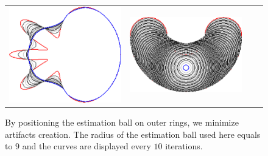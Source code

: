 {\begin{figure}
\begin{tabular}{p{3em}ccc}
\includegraphics[scale=0.25]{figures/chapter6/level-effect/flower/improve/len_pen0/radius-9/level9/summary.pdf} &
\includegraphics[scale=0.25]{figures/chapter6/level-effect/bean/improve/len_pen0/radius-9/level9/summary.pdf} \\[2em]
\end{tabular}
\caption{By positioning the estimation ball on outer rings, we minimize artifacts creation. The radius of the estimation ball used here equals to $9$ and the curves are displayed every $10$ iterations. \label{fig:mrings-r9-evolution}}
\end{figure}

}
